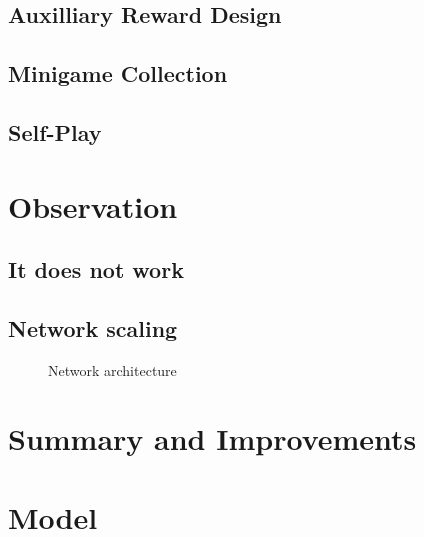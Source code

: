 \documentclass[12pt]{article}
\begin{document}
\subsection{Auxilliary Reward Design}

\subsection{Minigame Collection} %
\subsection{Self-Play} %

\section{Observation}
\subsection{It does not work}
\subsection{Network scaling} %

\begin{figure}
  \centering
  
  \caption{Network architecture}
\end{figure}


\section{Summary and Improvements}






\section{Model}
\end{document}
